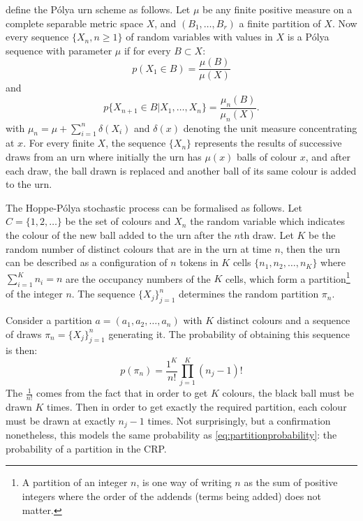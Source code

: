 \textcite{Blackwell1973Ferguson} define the P\'olya urn scheme as follows. Let $\mu$ be any finite positive measure on a complete separable metric space $X$, and $(B_1,\dots,B_r)$ a finite partition of $X$. Now every sequence $\{X_n,n\geq 1\}$ of random variables with values in $X$ is a P\'olya sequence with parameter $\mu$ if for every $B\subset X$:
\begin{equation}
	p(X_1\in B) = \frac{\mu(B)}{\mu(X)}
\end{equation}
and
\begin{equation}
	p\{X_{n+1}\in B | X_1,\ldots,X_n\} = \frac{\mu_n(B)}{\mu_n(X)}.
\end{equation}
with $\mu_n = \mu + \sum_{i=1}^n \delta(X_i)$ and $\delta(x)$ denoting the unit measure concentrating at $x$. For every finite $X$, the sequence $\{X_n\}$ represents the results of successive draws from an urn where initially the urn has $\mu(x)$ balls of colour $x$, and after each draw, the ball drawn is replaced and another ball of its same colour is added to the urn.

The Hoppe-P\'olya stochastic process can be formalised as follows. Let $C = \{1,2,\ldots\}$ be the set of colours and $X_n$ the random variable which indicates the colour of the new ball added to the urn after the $n$th draw. Let $K$ be the random number of distinct colours that are in the urn at time $n$, then the urn can be described as a configuration of $n$ tokens in $K$ cells $\{n_1, n_2, \ldots, n_K\}$ where $\sum_{i=1}^K n_i = n$ are the occupancy numbers of the $K$ cells, which form a partition\footnote{A partition of an integer $n$, is one way of writing $n$ as the sum of positive integers where the
order of the addends (terms being added) does not matter.} of the integer $n$. The sequence $\{X_j\}_{j=1}^n$ determines the random partition $\pi_{n}$.

Consider a partition $a = (a_1,a_2,\ldots,a_n)$ with $K$ distinct colours and a sequence of draws $\pi_{n} = \{X_j\}_{j=1}^n$ generating it. The probability of obtaining this sequence is then:
\begin{equation}
	p(\pi_n) = \frac{1^K}{n!}\prod_{j=1}^K (n_j-1)!
\end{equation}
The $\frac{1}{n!}$ comes from the fact that in order to get $K$ colours, the black ball must be drawn $K$ times. Then in order to get exactly the required partition, each colour must be drawn at exactly $n_j-1$ times. Not surprisingly, but a confirmation nonetheless, this models the same probability as \cref{eq:partitionprobability}: the probability of a partition in the CRP.

